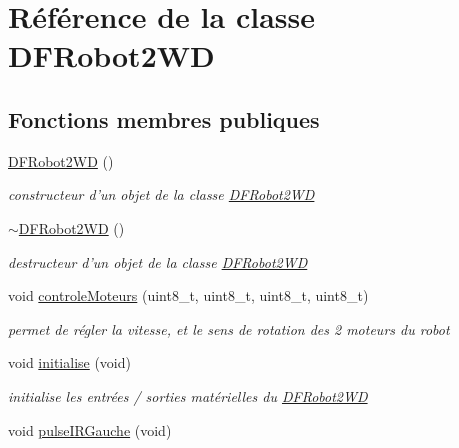 \hypertarget{class_d_f_robot2_w_d}{\section{Référence de la classe D\-F\-Robot2\-W\-D}
\label{class_d_f_robot2_w_d}
}
\subsection*{Fonctions membres publiques}
\begin{DoxyCompactItemize}
\item 
\hypertarget{class_d_f_robot2_w_d_a8c1e6ff7fb5536da4cdbe735216f280d}{\hyperlink{class_d_f_robot2_w_d_a8c1e6ff7fb5536da4cdbe735216f280d}{D\-F\-Robot2\-W\-D} ()}\label{class_d_f_robot2_w_d_a8c1e6ff7fb5536da4cdbe735216f280d}

\begin{DoxyCompactList}\small\item\em constructeur d'un objet de la classe \hyperlink{class_d_f_robot2_w_d}{D\-F\-Robot2\-W\-D} \end{DoxyCompactList}\item 
\hypertarget{class_d_f_robot2_w_d_a93ae9e94148fc92238311aeae7e6ce51}{\hyperlink{class_d_f_robot2_w_d_a93ae9e94148fc92238311aeae7e6ce51}{$\sim$\-D\-F\-Robot2\-W\-D} ()}\label{class_d_f_robot2_w_d_a93ae9e94148fc92238311aeae7e6ce51}

\begin{DoxyCompactList}\small\item\em destructeur d'un objet de la classe \hyperlink{class_d_f_robot2_w_d}{D\-F\-Robot2\-W\-D} \end{DoxyCompactList}\item 
void \hyperlink{class_d_f_robot2_w_d_a8ef0540ce25d496f0b7241fd65eb9be8}{controle\-Moteurs} (uint8\-\_\-t, uint8\-\_\-t, uint8\-\_\-t, uint8\-\_\-t)
\begin{DoxyCompactList}\small\item\em permet de régler la vitesse, et le sens de rotation des 2 moteurs du robot \end{DoxyCompactList}\item 
\hypertarget{class_d_f_robot2_w_d_abb0e83fb8a8c0d1b24478ecf4635e4e6}{void \hyperlink{class_d_f_robot2_w_d_abb0e83fb8a8c0d1b24478ecf4635e4e6}{initialise} (void)}\label{class_d_f_robot2_w_d_abb0e83fb8a8c0d1b24478ecf4635e4e6}

\begin{DoxyCompactList}\small\item\em initialise les entrées / sorties matérielles du \hyperlink{class_d_f_robot2_w_d}{D\-F\-Robot2\-W\-D} \end{DoxyCompactList}\item 
\hypertarget{class_d_f_robot2_w_d_a0e61bccfdb5ef356661f3e23564b4b08}{void \hyperlink{class_d_f_robot2_w_d_a0e61bccfdb5ef356661f3e23564b4b08}{pulse\-I\-R\-Gauche} (void)}\label{class_d_f_robot2_w_d_a0e61bccfdb5ef356661f3e23564b4b08}


\end{DoxyCompactItemize}
